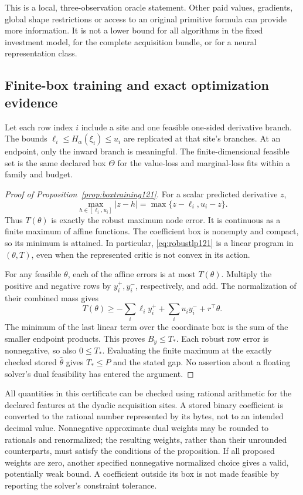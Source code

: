 This is a local, three-observation oracle statement.  Other
paid values, gradients, global shape restrictions or access
to an original primitive formula can provide more information.
It is not a lower bound for all algorithms in the fixed
investment model, for the complete acquisition bundle, or
for a neural representation class.

\subsection{Finite-box training and exact optimization evidence}

Let each row index \(i\) include a site and one feasible
one-sided derivative branch.  The bounds
\(\ell_i\leq H_\alpha(\xi_i)\leq u_i\) are replicated at
that site's branches.  At an endpoint, only the inward
branch is meaningful.
The finite-dimensional feasible set is the same declared
box \(\Theta\) for the value-loss and marginal-loss fits
within a family and budget.

\begin{proof}[Proof of Proposition~\ref{prop:boxtraining121}]
For a scalar predicted derivative \(z\),
\[
 \max_{h\in[\ell_i,u_i]}|z-h|
      =\max\{z-\ell_i,u_i-z\}.
\]
Thus \(T(\theta)\) is exactly the robust maximum node error.
It is continuous as a finite maximum of affine functions.
The coefficient box is nonempty and compact, so its minimum
is attained.  In particular, \eqref{eq:robustlp121} is a
linear program in \((\theta,T)\), even when the represented
critic is not convex in its action.

For any feasible \(\theta\), each of the affine errors is
at most \(T(\theta)\).  Multiply the positive and negative
rows by \(y_i^+,y_i^-\), respectively, and add.  The
normalization of their combined mass gives
\[
 T(\theta)\geq
     -\sum_i\ell_i y_i^++\sum_i u_i y_i^-
                  +r^\top\theta.
\]
The minimum of the last linear term over the coordinate box
is the sum of the smaller endpoint products.  This proves
\(B_y\leq T_*\).
Each robust row error is nonnegative, so also \(0\leq T_*\).
Evaluating the finite maximum at the exactly checked stored
\(\widehat\theta\) gives \(T_*\leq P\) and the stated gap.
No assertion about a floating solver's dual feasibility has
entered the argument.
\end{proof}

All quantities in this certificate can be checked using
rational arithmetic for the declared features at the
dyadic acquisition sites.  A stored binary coefficient is
converted to the rational number represented by its bytes,
not to an intended decimal value.  Nonnegative approximate
dual weights may be rounded to rationals and renormalized;
the resulting weights, rather than their unrounded
counterparts, must satisfy the conditions of the proposition.
If all proposed weights are zero, another specified
nonnegative normalized choice gives a valid, potentially
weak bound.  A coefficient outside its box is not made
feasible by reporting the solver's constraint tolerance.

